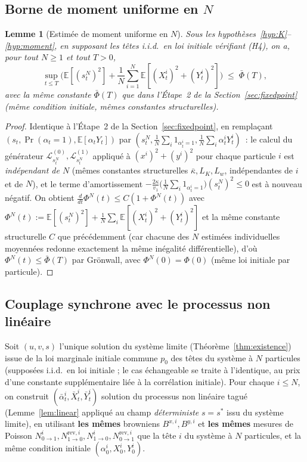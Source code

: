 \documentclass[11pt,a4paper]{article}
\newcommand{\ind}[1]{\mathrm{1}_{#1}}
\newcommand{\E}{\mathbb{E}}
\theoremstyle{plain}
\newtheorem{lem}[thm]{Lemme}
\theoremstyle{definition}
\begin{document}
\subsection{Borne de moment uniforme en $N$}

\begin{lem}[Estim\'ee de moment uniforme en $N$]
\label{lem:momentN}
Sous les hypoth\`eses~\ref{hyp:K}--\ref{hyp:moment}, en supposant les t\^etes i.i.d.\ en loi initiale v\'erifiant (H4), on a, pour tout $N\ge1$ et tout $T>0$,
\[
\sup_{t\le T}\Big(\E[(s_t^N)^2] + \frac1N\sum_{i=1}^N\E[(X_t^i)^2+(Y_t^i)^2]\Big) \;\le\; \bar\Phi(T),
\]
avec la \emph{m\^eme} constante $\bar\Phi(T)$ que dans l'\'Etape~2 de la Section~\ref{sec:fixedpoint} (m\^eme condition initiale, m\^emes constantes structurelles).
\end{lem}
\begin{proof}
Identique \`a l'\'Etape~2 de la Section~\ref{sec:fixedpoint}, en rempla\c cant $(s_t,\Pr(\alpha_t=1),\E[\alpha_tY_t])$ par $(s_t^N,\frac1N\sum_i\ind{\alpha_t^i=1},\frac1N\sum_i\alpha_t^i Y_t^i)$~: le calcul du g\'en\'erateur $\mathcal L^{(0)}_{s_t^N},\mathcal L^{(1)}_{s_t^N}$ appliqu\'e \`a $(x^i)^2+(y^i)^2$ pour chaque particule $i$ est \emph{ind\'ependant de $N$} (m\^emes constantes structurelles $\bar\kappa,L_K,L_w$, ind\'ependantes de $i$ et de $N$), et le terme d'amortissement $-\frac{2\kappa}{v_1}\big(\frac1N\sum_i\ind{\alpha_t^i=1}\big)(s_t^N)^2\le0$ est \`a nouveau n\'egatif. On obtient $\frac{d}{dt}\Phi^N(t)\le C(1+\Phi^N(t))$ avec $\Phi^N(t):=\E[(s_t^N)^2]+\frac1N\sum_i\E[(X_t^i)^2+(Y_t^i)^2]$ et la m\^eme constante structurelle $C$ que pr\'ec\'edemment (car chacune des $N$ estim\'ees individuelles moyenn\'ees redonne exactement la m\^eme in\'egalit\'e diff\'erentielle), d'o\`u $\Phi^N(t)\le\bar\Phi(T)$ par Gr\"onwall, avec $\Phi^N(0)=\Phi(0)$ (m\^eme loi initiale par particule).
\end{proof}

\subsection{Couplage synchrone avec le processus non lin\'eaire}

Soit $(u,v,s)$ l'unique solution du syst\`eme limite (Th\'eor\`eme~\ref{thm:existence}) issue de la loi marginale initiale commune $p_0$ des t\^etes du syst\`eme \`a $N$ particules (suppos\'ees i.i.d.\ en loi initiale ; le cas \'echangeable se traite \`a l'identique, au prix d'une constante suppl\'ementaire li\'ee \`a la corr\'elation initiale). Pour chaque $i\le N$, on construit $(\bar\alpha^i_t,\bar X^i_t,\bar Y^i_t)$ solution du processus non lin\'eaire tagu\'e (Lemme~\ref{lem:linear} appliqu\'e au champ \emph{d\'eterministe} $s=s^\ast$ issu du syst\`eme limite), en utilisant \textbf{les m\^emes} browniens $B^{x,i},B^{y,i}$ et \textbf{les m\^emes} mesures de Poisson $N_{0\to1}^i,N_{1\to0}^{\mathrm{rev},i},N_{1\to0}^i,N_{0\to1}^{\mathrm{rev},i}$ que la t\^ete $i$ du syst\`eme \`a $N$ particules, et la m\^eme condition initiale $(\alpha_0^i,X_0^i,Y_0^i)$.
\end{document}
